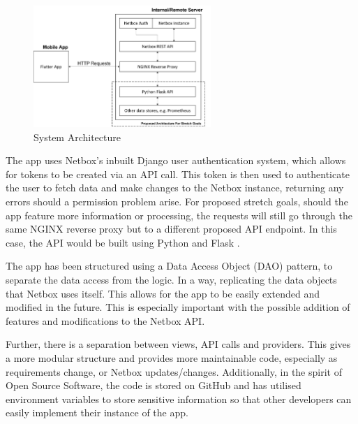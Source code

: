 \documentclass [11pt,a4paper]{article}
\begin{document}
\begin{figure}[H]
    \centering
    \includegraphics[width=0.6\textwidth]{images/top-level-archi.png}
    \caption{System Architecture}
    \label{fig:architecture}
\end{figure}

The app uses Netbox's inbuilt Django user authentication system, which allows for tokens to be created via an API call. This token is then used to authenticate the user to fetch data and make changes to the Netbox instance, returning any errors should a permission problem arise. For proposed stretch goals, should the app feature more information or processing, the requests will still go through the same NGINX reverse proxy but to a different proposed API endpoint. In this case, the API would be built using Python and Flask \cite{flask}. 

The app has been structured using a Data Access Object (DAO) pattern\cite{dao}, to separate the data access from the logic. In a way, replicating the data objects that Netbox uses itself. This allows for the app to be easily extended and modified in the future. This is especially important with the possible addition of features and modifications to the Netbox API.

Further, there is a separation between views, API calls and providers. This gives a more modular structure and provides more maintainable code, especially as requirements change, or Netbox updates/changes. Additionally, in the spirit of Open Source Software, the code is stored on GitHub \cite{keeptrackgithub} and has utilised environment variables to store sensitive information so that other developers can easily implement their instance of the app.
\end{document}
